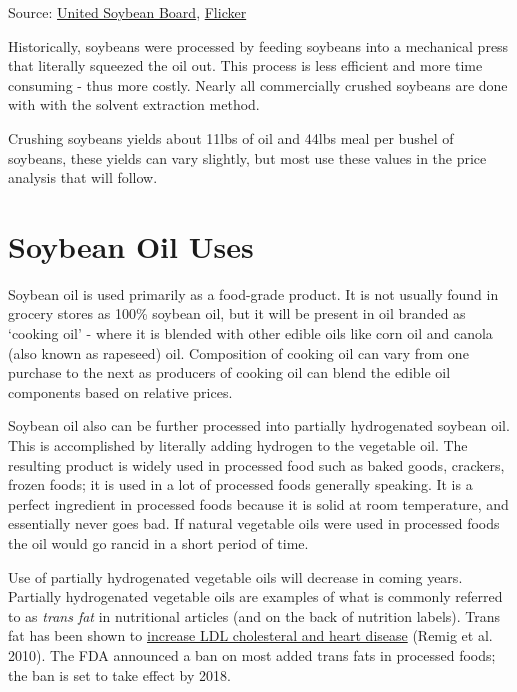\documentclass[
  letterpaper,
  DIV=11,
  numbers=noendperiod]{scrreprt}
\begin{document}
Source: \href{http://unitedsoybean.org/}{United Soybean Board},
\href{https://www.flickr.com/photos/unitedsoybean/10058954054/}{Flicker}

Historically, soybeans were processed by feeding soybeans into a
mechanical press that literally squeezed the oil out. This process is
less efficient and more time consuming - thus more costly. Nearly all
commercially crushed soybeans are done with with the solvent extraction
method.

Crushing soybeans yields about 11lbs of oil and 44lbs meal per bushel of
soybeans, these yields can vary slightly, but most use these values in
the price analysis that will follow.

\hypertarget{soybean-oil-uses}{%
\section{Soybean Oil Uses}\label{soybean-oil-uses}}

Soybean oil is used primarily as a food-grade product. It is not usually
found in grocery stores as 100\% soybean oil, but it will be present in
oil branded as `cooking oil' - where it is blended with other edible
oils like corn oil and canola (also known as rapeseed) oil. Composition
of cooking oil can vary from one purchase to the next as producers of
cooking oil can blend the edible oil components based on relative
prices.

Soybean oil also can be further processed into partially hydrogenated
soybean oil. This is accomplished by literally adding hydrogen to the
vegetable oil. The resulting product is widely used in processed food
such as baked goods, crackers, frozen foods; it is used in a lot of
processed foods generally speaking. It is a perfect ingredient in
processed foods because it is solid at room temperature, and essentially
never goes bad. If natural vegetable oils were used in processed foods
the oil would go rancid in a short period of time.

Use of partially hydrogenated vegetable oils will decrease in coming
years. Partially hydrogenated vegetable oils are examples of what is
commonly referred to as \emph{trans fat} in nutritional articles (and on
the back of nutrition labels). Trans fat has been shown to
\href{http://www.fda.gov/ForConsumers/ConsumerUpdates/ucm372915.htm}{increase
LDL cholesteral and heart disease} (Remig et al. 2010). The FDA
announced a ban on most added trans fats in processed foods; the ban is
set to take effect by 2018.
\end{document}
